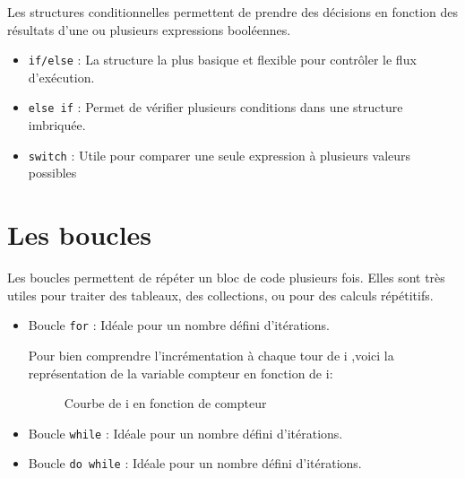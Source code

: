 Les structures conditionnelles permettent de prendre des décisions en fonction des résultats d'une ou plusieurs expressions booléennes.

\begin{itemize}
	\item \lstinline[]|if/else| : La structure la plus basique et flexible pour contrôler le flux d’exécution.
	
	
	\item \lstinline|else if| : Permet de vérifier plusieurs conditions dans une structure imbriquée.
	
	
	
	\item \lstinline|switch| : Utile pour comparer une seule expression à plusieurs valeurs possibles
	
	
	
\end{itemize}

\section{Les boucles}

Les boucles permettent de répéter un bloc de code plusieurs fois. Elles sont très utiles pour traiter des tableaux, des collections, ou pour des calculs répétitifs.

\begin{itemize}
	\item Boucle \lstinline|for| : Idéale pour un nombre défini d'itérations.
	
	
	
	Pour bien comprendre l'incrémentation à chaque tour de i ,voici la représentation de la variable compteur en fonction de i:
	
	\begin{figure}[ht]
	\centering
	\caption{Courbe de i en fonction de compteur}
	\end{figure}
	
	
	\item Boucle \lstinline|while| : Idéale pour un nombre défini d'itérations.
	
	
	
	\item Boucle \lstinline|do while| : Idéale pour un nombre défini d'itérations.
	
	
\end{itemize}